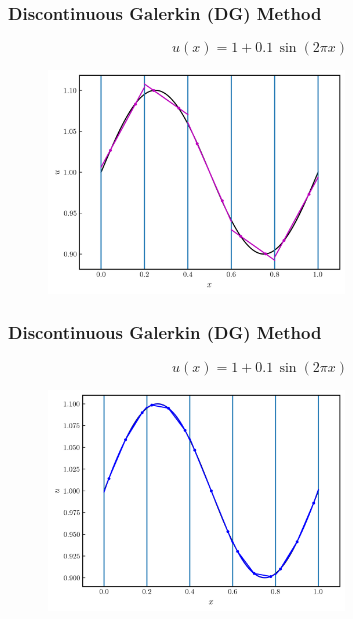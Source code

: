 \documentclass{beamer}
\begin{document}
\begin{frame}
\frametitle{Discontinuous Galerkin (DG) Method}

  \Fontvi

  \begin{equation*}
    u\left(x\right)=1+0.1\,\sin\left(2\pi x\right)
  \end{equation*}

  \begin{figure}[htb!]
    \centering
    \includegraphics[width=0.7\textwidth]{fig.sineWithLines_DG1.png}
  \end{figure}

\end{frame}

\begin{frame}
\frametitle{Discontinuous Galerkin (DG) Method}

  \Fontvi

  \begin{equation*}
    u\left(x\right)=1+0.1\,\sin\left(2\pi x\right)
  \end{equation*}

  \begin{figure}[htb!]
    \centering
    \includegraphics[width=0.7\textwidth]{fig.sineWithLines_DG2.png}
  \end{figure}

\end{frame}
\end{document}
